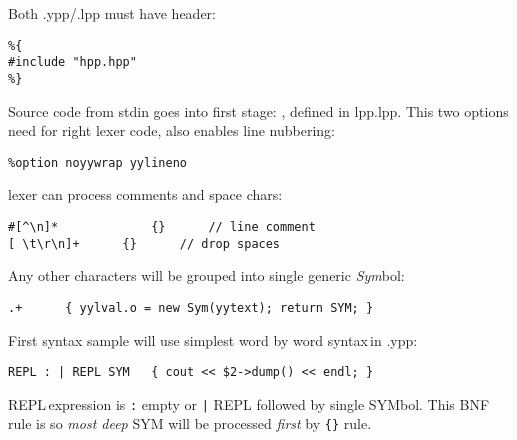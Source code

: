 \medskip\noindent
Both .ypp/.lpp must have header:
\begin{lstlisting}
%{
#include "hpp.hpp"
%}
\end{lstlisting}

\pg Source code from stdin goes into first stage: , defined in
lpp.lpp. This two options need for right lexer code, also enables line
nubbering:
\begin{lstlisting}
%option noyywrap yylineno
\end{lstlisting}
\noindent lexer can process comments and space chars:
\begin{lstlisting}
#[^\n]*				{}		// line comment
[ \t\r\n]+		{}		// drop spaces
\end{lstlisting}
\noindent Any other characters will be grouped into single generic
\emph{Sym}bol:
\begin{lstlisting}
.+		{ yylval.o = new Sym(yytext); return SYM; }
\end{lstlisting}

\pg First syntax sample will use simplest word by word syntax\,in .ypp:
\begin{lstlisting}
REPL : | REPL SYM	{ cout << $2->dump() << endl; }
\end{lstlisting}
REPL\,expression is \verb$:$ empty or \verb$|$ REPL
followed by single SYMbol. This BNF rule is  so \emph{most
deep} SYM will be processed \emph{first} by \verb${}$ rule.

\secup
